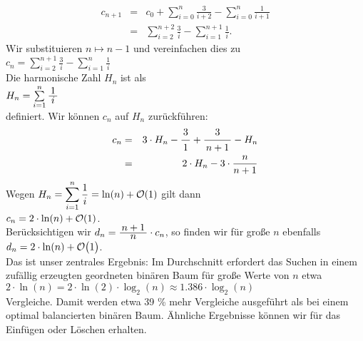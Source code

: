 \begin{eqnarray*}  
  c_{n+1} & = & c_0 + \sum\limits_{i=0}^{n} \frac{3}{i+2} - \sum\limits_{i=0}^{n} \frac{1}{i+1} 
\\[0.2cm]
          & = & \sum\limits_{i=2}^{n+2} \frac{3}{i} - \sum\limits_{i=1}^{n+1} \frac{1}{i}.
\end{eqnarray*}
Wir substituieren $n \mapsto n-1$ und vereinfachen dies zu 
\\[0.2cm]
\hspace*{1.3cm}
$c_{n} =  \displaystyle\sum\limits_{i=2}^{n+1} \frac{3}{i} - \sum\limits_{i=1}^{n} \frac{1}{i}$
\\[0.2cm]
Die harmonische Zahl $H_n$ ist als
\\[0.2cm]
\hspace*{1.3cm}
$H_n = \sum\limits_{i=1}^{n} \bruch{1}{i}$   
\\[0.2cm]
definiert.  Wir k\"onnen $c_n$ auf $H_n$ zur\"uckf\"uhren: 
\begin{eqnarray*}
   c_n & = & 3 \cdot H_n - \bruch{3}{1} + \bruch{3}{n+1} - H_n \\
       & = & 2 \cdot H_n - 3 \cdot \frac{n}{n+1} 
\end{eqnarray*}
Wegen $H_n = \displaystyle\sum\limits_{i=1}^{n} \frac{1}{i} = \ln(n) + \mathcal{O}(1)$ gilt dann \\[0.2cm]
\hspace*{1.3cm} 
$\displaystyle c_n = 2 \cdot \ln(n) + \mathcal{O}(1)$.
\\[0.2cm]
Ber\"ucksichtigen wir  $d_n = \bruch{n+1}{n}\cdot c_n$, so finden wir f\"ur gro{\ss}e $n$ ebenfalls \\[0.2cm]
\hspace*{1.3cm} $\displaystyle d_n = 2 \cdot \ln(n) + \mathcal{O}\bigl(1\bigr)$.
\\[0.2cm]
Das ist unser zentrales Ergebnis: Im Durchschnitt erfordert das Suchen in einem zuf\"allig
erzeugten geordneten bin\"aren Baum f\"ur gro{\ss}e Werte von $n$ etwa 
\\[0.2cm]
\hspace*{1.3cm}
$2 \cdot \ln(n) = 2 \cdot \ln(2) \cdot \log_2(n) \approx 1.386 \cdot \log_2(n)$ 
\\[0.2cm]
Vergleiche.  Damit werden etwa 39 \% 
mehr Vergleiche ausgef\"uhrt als bei einem optimal balancierten bin\"aren Baum.
\"Ahnliche Ergebnisse k\"onnen wir f\"ur das Einf\"ugen oder L\"oschen erhalten.

